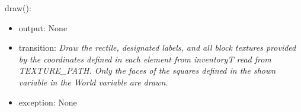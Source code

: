 \documentclass[12pt]{article}
\begin{document}
\noindent draw():
\begin{itemize}
\item output: None
\item transition: \textit{Draw the rectile, designated labels, and all block textures provided by the coordinates defined in each element from inventoryT read from TEXTURE\_PATH. Only the faces of the squares defined in the shown variable in the World variable are drawn.}
\item exception: None\\
\end{itemize}

\newpage
\end{document}
